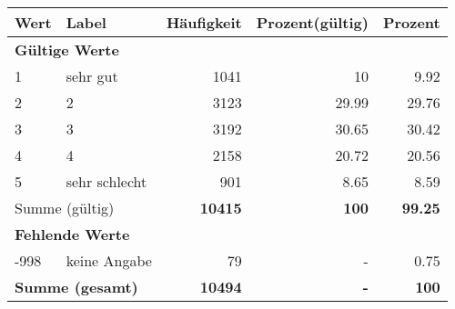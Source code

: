      \begin{longtable}{lXrrr}
     \toprule
     \textbf{Wert} & \textbf{Label} & \textbf{Häufigkeit} & \textbf{Prozent(gültig)} & \textbf{Prozent} \\
     \endhead
     \midrule
     \multicolumn{5}{l}{\textbf{Gültige Werte}}\\

     1 &
     \multicolumn{1}{X}{ sehr gut   } &


       \num{1041} &
       \num[round-mode=places,round-precision=2]{10} &
         \num[round-mode=places,round-precision=2]{9,92} \\

     2 &
     \multicolumn{1}{X}{ 2   } &


       \num{3123} &
       \num[round-mode=places,round-precision=2]{29,99} &
         \num[round-mode=places,round-precision=2]{29,76} \\

     3 &
     \multicolumn{1}{X}{ 3   } &


       \num{3192} &
       \num[round-mode=places,round-precision=2]{30,65} &
         \num[round-mode=places,round-precision=2]{30,42} \\

     4 &
     \multicolumn{1}{X}{ 4   } &


       \num{2158} &
       \num[round-mode=places,round-precision=2]{20,72} &
         \num[round-mode=places,round-precision=2]{20,56} \\

     5 &
     \multicolumn{1}{X}{ sehr schlecht   } &


       \num{901} &
       \num[round-mode=places,round-precision=2]{8,65} &
         \num[round-mode=places,round-precision=2]{8,59} \\
     \midrule
     \multicolumn{2}{l}{Summe (gültig)} &
       \textbf{\num{10415}} &
     \textbf{100} &
       \textbf{\num[round-mode=places,round-precision=2]{99,25}} \\
     \multicolumn{5}{l}{\textbf{Fehlende Werte}}\\
       -998 &
       keine Angabe &
         \num{79} &
        - &
         \num[round-mode=places,round-precision=2]{0,75} \\
     \midrule
     \multicolumn{2}{l}{\textbf{Summe (gesamt)}} &
          \textbf{\num{10494}} &
        \textbf{-} &
        \textbf{100} \\
     \bottomrule
     \end{longtable}
     
